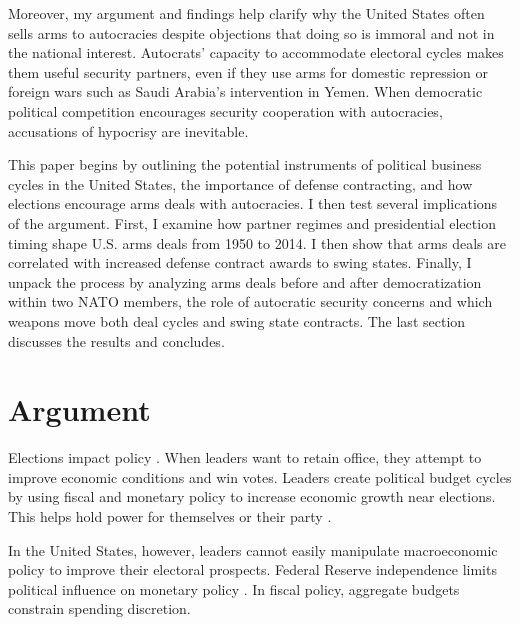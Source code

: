 \documentclass[12pt]{article}
\begin{document}
Moreover, my argument and findings help clarify why the United States often sells arms to autocracies despite objections that doing so is immoral and not in the national interest.  
Autocrats' capacity to accommodate electoral cycles makes them useful security partners, even if they use arms for domestic repression or foreign wars such as Saudi Arabia's intervention in Yemen. 
When democratic political competition encourages security cooperation with autocracies, accusations of hypocrisy are inevitable. 


This paper begins by outlining the potential instruments of political business cycles in the United States, the importance of defense contracting, and how elections encourage arms deals with autocracies. 
I then test several implications of the argument. 
First, I examine how partner regimes and presidential election timing shape U.S. arms deals from 1950 to 2014.
I then show that arms deals are correlated with increased defense contract awards to swing states.
Finally, I unpack the process by analyzing arms deals before and after democratization within two NATO members, the role of autocratic security concerns and which weapons move both deal cycles and swing state contracts.
The last section discusses the results and concludes.


\section{Argument}




Elections impact policy \citep{Nordhaus1975}.
When leaders want to retain office, they attempt to improve economic conditions and win votes. 
Leaders create political budget cycles by using fiscal and monetary policy to increase economic growth near elections.
This helps hold power for themselves or their party \citep{Tufte1978, Rogoff1987}. 


In the United States, however, leaders cannot easily manipulate macroeconomic policy to improve their electoral prospects.  
Federal Reserve independence limits political influence on monetary policy \citep{ClarkHallerberg2000}. 
In fiscal policy, aggregate budgets constrain spending discretion.
\end{document}
